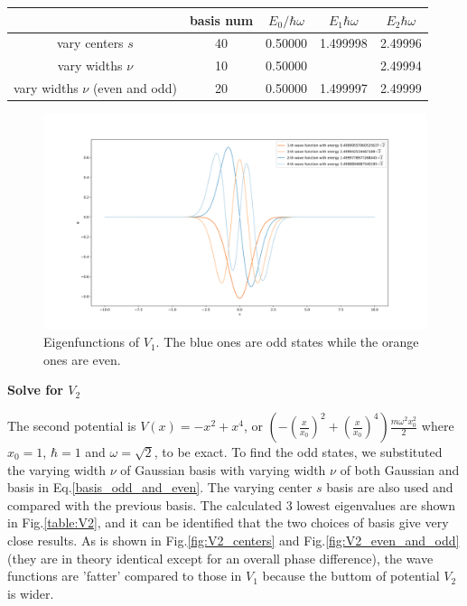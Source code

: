 \documentclass{article}
\begin{document}
\begin{center}
    \begin{tabular}{c|c|c|c|c}
        \hline
         &basis num& $E_0/\hbar\omega$ & $E_1\hbar\omega$ & $E_2\hbar\omega$\\
        \hline        
        vary centers $s$ &40& 0.50000 &1.499998 & 2.49996\\
        vary widths $\nu$ & 10 &0.50000& &2.49994\\
        vary widths $\nu$ (even and odd)& 20 & 0.50000 & 1.499997& 2.49999\\
\hline
    \end{tabular}\label{table:V1}
\end{center}

\begin{figure}[!htb]
    \centering
    \includegraphics[width=1\textwidth]{wavefuncplot_basis_num=10.png}
    \caption{Eigenfunctions of $V_1$. The blue ones are odd states while the orange ones are even.}
    \label{fig:V1_even_and_odd}
\end{figure}
\textbf{Solve for $V_2$}\par
The second potential is $V(x)=-x^2+x^4$, or $(-(\frac{x}{x_0})^2 + (\frac{x}{x_0})^4)\frac{m\omega^2x_0^2}{2}$ where $x_0=1$, $\hbar=1$ and $\omega=\sqrt{2}$, to be exact. To find the odd states, we substituted the varying width $\nu$ of Gaussian basis with varying width $\nu$ of both Gaussian and basis in Eq.\ref{basis_odd_and_even}. The varying center $s$ basis are also used and compared with the previous basis. The calculated 3 lowest eigenvalues are shown in Fig.\ref{table:V2}, and it can be identified that the two choices of basis give very close results. As is shown in Fig.\ref{fig:V2_centers} and Fig.\ref{fig:V2_even_and_odd} (they are in theory identical except for an overall phase difference), the wave functions are 'fatter' compared to those in $V_1$ because the buttom of potential $V_2$ is wider.
\end{document}
